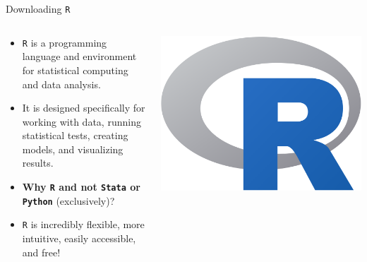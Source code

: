 \documentclass[
  ignorenonframetext,
]{beamer}
\begin{document}
\begin{frame}{Downloading \texttt{R}}
\label{downloading-1}
\begin{columns}[T] %
  \begin{column}{0.65\textwidth}
  \par \vspace{2.5mm}
  \begin{itemize}
  
  \item \texttt{R} is a programming language and environment for statistical computing and data analysis. \par \vspace{2.5mm}
  
  \item It is designed specifically for working with data, running statistical tests, creating models, and visualizing results. \par \vspace{2.5mm}
  
  \item \textbf{Why \texttt{R} and not \texttt{Stata} or \texttt{Python}} (exclusively)? \par \vspace{2.5mm}
  
  \item \texttt{R} is incredibly flexible, more intuitive, easily accessible, and free! 
  
  \end{itemize}
  \end{column}

  \begin{column}{0.5\textwidth}
    \centering
    \vspace{2.5mm}
    \includegraphics[width=0.75\linewidth]{../../images/R_logo.png}
    \vfill

  \end{column}
\end{columns}
\end{frame}
\end{document}
